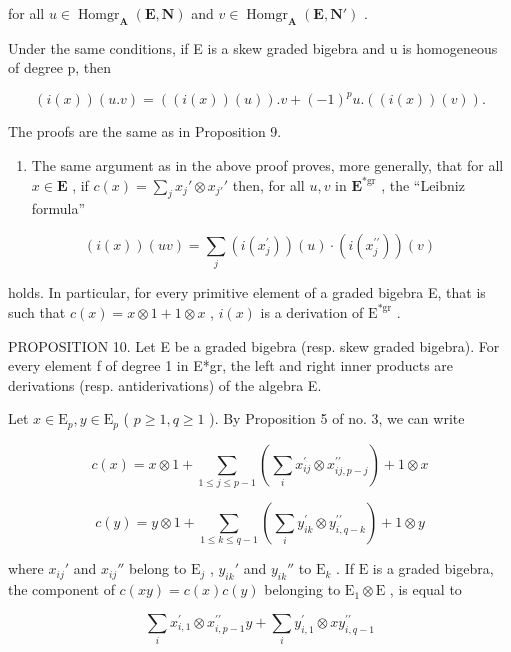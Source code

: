 for all \(u \in \operatorname{Homgr}_{\mathbf{A}}(\mathbf{E}, \mathbf{N})\) and \(v \in \operatorname{Homgr}_{\mathbf{A}}(\mathbf{E}, \mathbf{N}')\) .

Under the same conditions, if E is a skew graded bigebra and u is homogeneous of degree p, then

\[
(i (x)) (u. v) = ((i (x)) (u)). v + (- 1) ^ {p} u. ((i (x)) (v)).
\]

The proofs are the same as in Proposition 9.

\begin{enumerate}
\def\labelenumi{(\arabic{enumi})}
\setcounter{enumi}{1}
\tightlist
\item
  The same argument as in the above proof proves, more generally, that for all \(x \in \mathbf{E}\) , if \(c(x) = \sum_{j} x_j' \otimes x_{j'}'\) then, for all \(u, v\) in \(\mathbf{E}^{*\mathrm{gr}}\) , the ``Leibniz formula''
\end{enumerate}

\[
(i (x)) (u v) = \sum_ {j} (i (x _ {j} ^ {\prime})) (u) \cdot (i (x _ {j} ^ {\prime \prime})) (v)
\]

holds. In particular, for every primitive element of a graded bigebra E, that is such that \(c(x) = x \otimes 1 + 1 \otimes x\) , \(i(x)\) is a derivation of \(\mathrm{E}^{*\mathrm{gr}}\) .

PROPOSITION 10. Let E be a graded bigebra (resp. skew graded bigebra). For every element f of degree 1 in E*gr, the left and right inner products are derivations (resp. antiderivations) of the algebra E.

Let \(x \in \mathrm{E}_p, y \in \mathrm{E}_p\) ( \(p \geqslant 1, q \geqslant 1\) ). By Proposition 5 of no. 3, we can write

\[
c (x) = x \otimes 1 + \sum_ {1 \leqslant j \leqslant p - 1} \left(\sum_ {i} x _ {i j} ^ {\prime} \otimes x _ {i j, p - j} ^ {\prime \prime}\right) + 1 \otimes x
\]

\[
c (y) = y \otimes 1 + \sum_ {1 \leqslant k \leqslant q - 1} \left(\sum_ {i} y _ {i k} ^ {\prime} \otimes y _ {i, q - k} ^ {\prime \prime}\right) + 1 \otimes y
\]

where \(x_{ij}'\) and \(x_{ij}''\) belong to \(\mathrm{E}_j\) , \(y_{ik}'\) and \(y_{ik}''\) to \(\mathrm{E}_k\) . If \(\mathrm{E}\) is a graded bigebra, the component of \(c(xy) = c(x)c(y)\) belonging to \(\mathrm{E}_1 \otimes \mathrm{E}\) , is equal to

\[
\sum_ {i} x _ {i, 1} ^ {\prime} \otimes x _ {i, p - 1} ^ {\prime \prime} y + \sum_ {i} y _ {i, 1} ^ {\prime} \otimes x y _ {i, q - 1} ^ {\prime \prime}
\]

